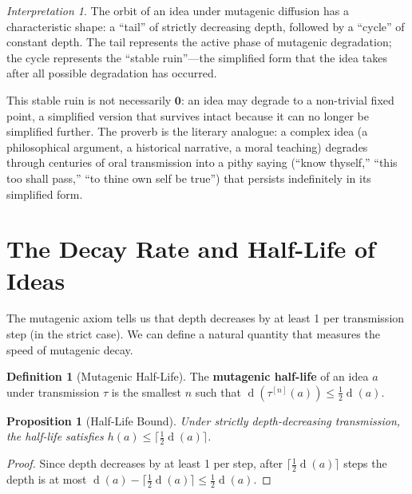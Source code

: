 \documentclass[11pt,openany]{book}
\theoremstyle{definition}
\newtheorem{definition}[axiom]{Definition}
\theoremstyle{plain}
\newtheorem{proposition}[axiom]{Proposition}
\theoremstyle{remark}
\newtheorem{interpretation}[axiom]{Interpretation}
\newcommand{\void}{\mathbf{0}}              %
\newcommand{\depth}{\operatorname{d}}       %
\newcommand{\transmit}{\tau}                 %
\begin{document}
\begin{interpretation}
The orbit of an idea under mutagenic diffusion has a characteristic shape: a ``tail'' of strictly decreasing depth, followed by a ``cycle'' of constant depth. The tail represents the active phase of mutagenic degradation; the cycle represents the ``stable ruin''---the simplified form that the idea takes after all possible degradation has occurred.

This stable ruin is not necessarily $\void$: an idea may degrade to a non-trivial fixed point, a simplified version that survives intact because it can no longer be simplified further. The proverb is the literary analogue: a complex idea (a philosophical argument, a historical narrative, a moral teaching) degrades through centuries of oral transmission into a pithy saying (``know thyself,'' ``this too shall pass,'' ``to thine own self be true'') that persists indefinitely in its simplified form.
\end{interpretation}

\section{The Decay Rate and Half-Life of Ideas}

The mutagenic axiom tells us that depth decreases by at least 1 per transmission step (in the strict case). We can define a natural quantity that measures the speed of mutagenic decay.

\begin{definition}[Mutagenic Half-Life]
The \textbf{mutagenic half-life} of an idea $a$ under transmission $\transmit$ is the smallest $n$ such that $\depth(\transmit^{[n]}(a)) \leq \frac{1}{2}\depth(a)$.
\end{definition}

\begin{proposition}[Half-Life Bound]
Under strictly depth-decreasing transmission, the half-life satisfies $h(a) \leq \lceil \frac{1}{2}\depth(a) \rceil$.
\end{proposition}

\begin{proof}
Since depth decreases by at least 1 per step, after $\lceil \frac{1}{2}\depth(a) \rceil$ steps the depth is at most $\depth(a) - \lceil \frac{1}{2}\depth(a) \rceil \leq \frac{1}{2}\depth(a)$.
\end{proof}
\end{document}
